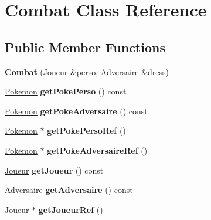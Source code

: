 \hypertarget{class_combat}{}\section{Combat Class Reference}
\label{class_combat}
\subsection*{Public Member Functions}
\begin{DoxyCompactItemize}
\item 
\mbox{\label{class_combat_af420be03c806ef847c0542ab0d7223f9}} 
{\bfseries Combat} (\hyperlink{class_joueur}{Joueur} \&perso, \hyperlink{class_adversaire}{Adversaire} \&dress)
\item 
\mbox{\label{class_combat_a6f3c9e5df27cfb30359dcb0425a45f6d}} 
\hyperlink{class_pokemon}{Pokemon} {\bfseries get\+Poke\+Perso} () const
\item 
\mbox{\label{class_combat_aa06e658e7fb4ab91174ba4d832588bae}} 
\hyperlink{class_pokemon}{Pokemon} {\bfseries get\+Poke\+Adversaire} () const
\item 
\mbox{\label{class_combat_a9a44a83a9c1fe5d67f0b620dab547e56}} 
\hyperlink{class_pokemon}{Pokemon} $\ast$ {\bfseries get\+Poke\+Perso\+Ref} ()
\item 
\mbox{\label{class_combat_a4f02e335d825eb98b64d5410a590b9f8}} 
\hyperlink{class_pokemon}{Pokemon} $\ast$ {\bfseries get\+Poke\+Adversaire\+Ref} ()
\item 
\mbox{\label{class_combat_a3784ddbca993b5ad0fb0d4dd382f919a}} 
\hyperlink{class_joueur}{Joueur} {\bfseries get\+Joueur} () const
\item 
\mbox{\label{class_combat_a018644148fc62da9c8abfafc166713c4}} 
\hyperlink{class_adversaire}{Adversaire} {\bfseries get\+Adversaire} () const
\item 
\mbox{\label{class_combat_af72bd31264a8cdeeb3f3f8c30c727d33}} 
\hyperlink{class_joueur}{Joueur} $\ast$ {\bfseries get\+Joueur\+Ref} ()
\item 
\mbox{\label{class_combat_a59088f5725884e9c363ad72a946c82ef}} 

\end{DoxyCompactItemize}

